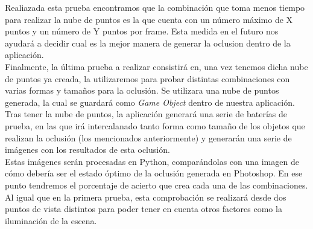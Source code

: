Realiazada esta prueba encontramos que la combinación que toma menos tiempo para realizar la nube de puntos es la que cuenta con un número máximo de X puntos y un número de Y puntos por frame. Esta medida en el futuro nos ayudará a decidir cual es la mejor manera de generar la oclusion dentro de la aplicación.\\

Finalmente, la última prueba a realizar consistirá en, una vez tenemos dicha nube de puntos ya creada, la utilizaremos para probar distintas combinaciones con varias formas y tamaños para la oclusión. Se utilizara una nube de puntos generada, la cual se guardará como \textit{Game Object} dentro de nuestra aplicación. Tras tener la nube de puntos, la aplicación generará una serie de baterías de prueba, en las que irá intercalanado tanto forma como tamaño de los objetos que realizan la oclusión (los mencionados anteriormente) y generarán una serie de imágenes con los resultados de esta oclusión.\\ 

Estas imágenes serán procesadas en Python, comparándolas con una imagen de cómo debería ser el estado óptimo de la oclusión generada en Photoshop. En ese punto tendremos el porcentaje de acierto que crea cada una de las combinaciones. Al igual que en la primera prueba, esta comprobación se realizará desde dos puntos de vista distintos para poder tener en cuenta otros factores como la iluminación de la escena.

\begin{table}[ht]
\centering
{}
\caption{Distintas formas para general la oclusión y tamaños con sus correspondientes porcentajes de acierto. }
\label{cuadro:comparacionpesopreciosHMD}
\end{table}